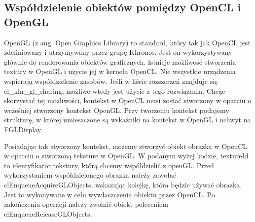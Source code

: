 \subsection [Współdzielenie obiektów pomiędzy OpenCL i OpenGL]{Współdzielenie obiektów pomiędzy OpenCL i OpenGL}
OpenGL (z ang. Open Graphics Library) to standard, który tak jak OpenCL jest zdefiniowany i utrzymywany przez grupę Khronos. Jest on wykorzystywany głównie do renderowania obiektów graficznych.
Istnieje możliwość stworzenia textury w OpenGL i użycie jej w kernelu OpenCL. Nie wszystkie urządzenia wspierają współdzielenie zasobów. Jeśli w liście rozszerzeń znajduje się cl\_khr\_gl\_sharing, możliwe wtedy jest użycie z tego rozwiązania. Chcąc skorzystać tej możliwości, kontekst w OpenCL musi zostać stworzony w oparciu o wcześniej stworzony kontekst OpenGL. Przy tworzeniu kontekst podajemy strukturę, w której umieszczone są wskaźniki na kontekst w OpenGL i uchwyt na EGLDisplay. 
 
 Posiadając tak stworzony kontekst, możemy stworzyć obiekt obrazka w OpenCL w oparciu o stworzoną teksture w OpenGL.
  W podanym wyżej kodzie, textureId to identyfikator tekstury, którą chcemy współdzielić z openGL. 
 Przed wykorzystaniem współdzielonego obrazka należy zawołać clEnqueueAcquireGLObjects, wskazując kolejkę, która będzie używać obrazka. Jest to wykonywane w celu wywłaszczenia obiektu przez OpenCL. Po zakończeniu operacji należy zwolnić obiekt poleceniem clEnqueueReleaseGLObjects.
